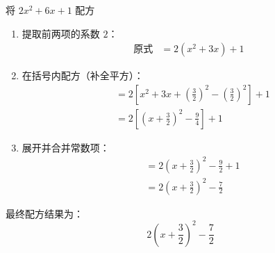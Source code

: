 \documentclass[lang=cn, 10pt, titlestyle=hang, oneside]{elegantbook}
\begin{document}
\begin{example}
    将 \(2x^2 + 6x+1\) 配方
\end{example}
\begin{solution}
\begin{enumerate}
    \item 提取前两项的系数 \(2\)：
    \begin{align*}
    \text{原式} &= 2\left(x^2 + 3x\right) + 1
    \end{align*}

    \item 在括号内配方（补全平方）：
    \begin{align*}
    &= 2\left[x^2 + 3x + \left(\frac{3}{2}\right)^2 - \left(\frac{3}{2}\right)^2\right] + 1\\
    &=2\left[\left(x + \frac{3}{2}\right)^2 - \frac{9}{4}\right] + 1
    \end{align*}

    \item 展开并合并常数项：
    \begin{align*}
    &=2\left(x + \frac{3}{2}\right)^2 - \frac{9}{2} + 1 \\
    &= 2\left(x + \frac{3}{2}\right)^2 - \frac{7}{2}
    \end{align*}
\end{enumerate}

最终配方结果为：
\[
2\left(x + \frac{3}{2}\right)^2 - \frac{7}{2}
\]

\end{solution}
\end{document}
